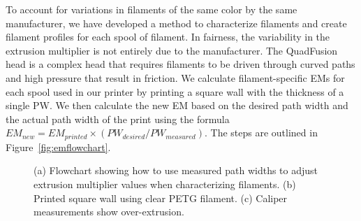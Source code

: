 To account for variations in filaments of the same color by the same manufacturer, we have developed a method to characterize filaments and create filament profiles for each spool of filament. In fairness, the variability in the extrusion multiplier is not entirely due to the manufacturer. The QuadFusion head is a complex head that requires filaments to be driven through curved paths and high pressure that result in friction. We calculate filament-specific \ac{EM}s for each spool used in our printer by printing a square wall with the thickness of a single \ac{PW}. We then calculate the new \ac{EM} based on the desired path width and the actual path width of the print using the formula $EM_{new} = EM_{printed} \times (PW_{desired}/PW_{measured})$. The steps are outlined in Figure~\ref{fig:emflowchart}.

\begin{figure}
	\begin{center}
	\end{center}
	\caption{(a) Flowchart showing how to use measured path widths to adjust extrusion multiplier values when characterizing filaments. (b) Printed square wall using clear \ac{PETG} filament. (c) Caliper measurements show over-extrusion.} 
	\label{fig:em}
\end{figure} 

